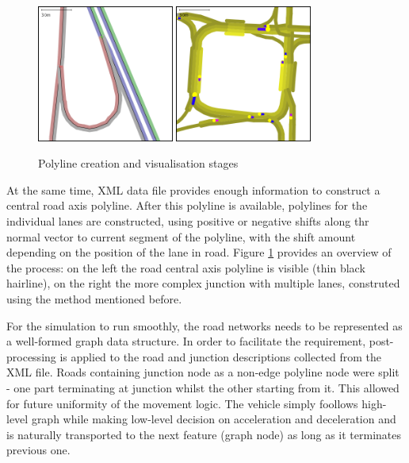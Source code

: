 \begin{figure}[h]
    \caption{Polyline creation and visualisation stages}
    \label{fig:roadAndLanesPolylines}
    \centering
    \includegraphics[width=0.4\textwidth]{figs/road/road_polyline.png}
    \hspace{0.2em}
    \includegraphics[width=0.4\textwidth]{figs/road/road_lanes.png}
\end{figure}

At the same time, XML data file provides enough information to construct a central road axis polyline. After this polyline is available, polylines for the individual lanes are constructed, using positive or negative shifts along thr normal vector to current segment of the polyline, with the shift amount depending on the position of the lane in road. Figure \ref{fig:roadAndLanesPolylines} provides an overview of the process: on the left the road central axis polyline is visible (thin black hairline), on the right the more complex junction with multiple lanes, construted using the method mentioned before.

For the simulation to run smoothly, the road networks needs to be represented as a well-formed graph data structure. In order to facilitate the requirement, post-processing is applied to the road and junction descriptions collected from the XML file. Roads containing junction node as a non-edge polyline node were split - one part terminating at junction whilst the other starting from it. This allowed for future uniformity of the movement logic. The vehicle simply foollows high-level graph while making low-level decision on acceleration and deceleration and is naturally transported to the next feature (graph node) as long as it terminates previous one.

